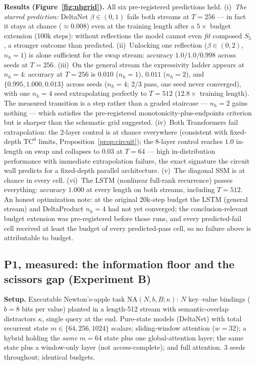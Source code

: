 \textbf{Results (Figure~\ref{fig:nhgrid}).} All six pre-registered predictions
held.
(i)~\emph{The starred prediction:} DeltaNet $\beta\in(0,1)$ fails both streams
at $T{=}256$ --- in fact it stays at chance ($\approx 0.008$) even at the
training length after a $5\times$ budget extension (100k steps): without
reflections the model cannot even \emph{fit} composed $S_5$, a stronger outcome
than predicted.
(ii)~Unlocking one reflection ($\beta\in(0,2)$, $n_h{=}1$) is alone sufficient
for the swap stream: accuracy $1.0/1.0/0.998$ across seeds at $T{=}256$.
(iii)~On the general stream the expressivity ladder appears at $n_h{=}4$:
accuracy at $T{=}256$ is $0.010$ ($n_h{=}1$), $0.011$ ($n_h{=}2$), and
$\{0.995, 1.000, 0.013\}$ across seeds ($n_h{=}4$; 2/3 pass, one seed never
converged), with one $n_h{=}4$ seed extrapolating perfectly to $T{=}512$
($12.8\times$ training length). The measured transition is a step rather than a
graded staircase --- $n_h{=}2$ gains nothing --- which satisfies the
pre-registered monotonicity-plus-endpoints criterion but is sharper than the
schematic grid suggested.
(iv)~Both Transformers fail extrapolation: the 2-layer control is at chance
everywhere (consistent with fixed-depth $\mathrm{TC}^0$ limits,
Proposition~\ref{prop:circuit}); the 8-layer control reaches $1.0$ in-length on
swap and collapses to $0.03$ at $T{=}64$ --- high in-distribution performance
with immediate extrapolation failure, the exact signature the circuit wall
predicts for a fixed-depth parallel architecture.
(v)~The diagonal SSM is at chance in every cell.
(vi)~The LSTM (nonlinear full-rank recurrence) passes everything: accuracy
$1.000$ at every length on both streams, including $T{=}512$.
An honest optimization note: at the original 20k-step budget the LSTM
(general stream) and DeltaProduct $n_h{=}4$ had not yet converged; the
conclusion-relevant budget extension was pre-registered before those runs, and
every predicted-fail cell received at least the budget of every predicted-pass
cell, so no failure above is attributable to budget.

\subsection{P1, measured: the information floor and the scissors gap
(Experiment B)}
\label{sec:expB}

\textbf{Setup.} Executable Newton's-apple task $\mathrm{NA}(N,b,B;\kappa)$:
$N$ key--value bindings ($b{=}8$ bits per value) planted in a length-512
stream with semantic-overlap distractors $\kappa$, single query at the end.
Pure-state models (DeltaNet) with total recurrent state $m\in\{64,256,1024\}$
scalars; sliding-window attention ($w{=}32$); a hybrid holding the \emph{same}
$m{=}64$ state plus one global-attention layer; the same state plus a
window-only layer (not access-complete); and full attention. 3 seeds
throughout; identical budgets.

